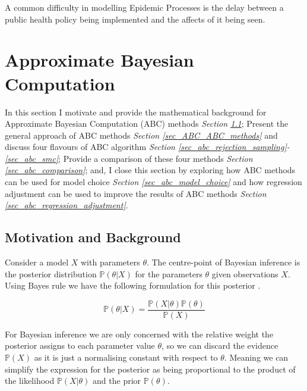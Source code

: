 \documentclass[11pt,a4paper]{article}
\newcommand*{\prob}{\mathbb{P}}
\theoremstyle{break}
\begin{document}
  \par A common difficulty in modelling Epidemic Processes is the delay between a public health policy being implemented and the affects of it being seen. %

\newpage
\section{Approximate Bayesian Computation}\label{sec_ABC}

  \par In this section I motivate and provide the mathematical background for Approximate Bayesian Computation (ABC) methods \textit{Section \ref{sec_ABC_background}}; Present the general approach of ABC methods \textit{Section \ref{sec_ABC_ABC_methods}} and discuss four flavours of ABC algorithm \textit{Section \ref{sec_abc_rejection_sampling}-\ref{sec_abc_smc}}; Provide a comparison of these four methods \textit{Section \ref{sec_abc_comparison}}; and, I close this section by exploring how ABC methods can be used for model choice \textit{Section \ref{sec_abc_model_choice}} and how regression adjustment can be used to improve the results of ABC methods \textit{Section \ref{sec_abc_regression_adjustment}}.

\subsection{Motivation and Background}\label{sec_ABC_background}


  \par Consider a model $X$ with parameters $\theta$. The centre-point of Bayesian inference is the posterior distribution $\prob(\theta|X)$ for the parameters $\theta$ given observations $X$. Using Bayes rule we have the following formulation for this posterior .

  \[ \prob(\theta|X)=\frac{\prob(X|\theta)\prob(\theta)}{\prob(X)} \]

  \par For Bayesian inference we are only concerned with the relative weight the posterior assigns to each parameter value $\theta$, so we can discard the evidence $\prob(X)$ as it is just a normalising constant with respect to $\theta$. Meaning we can simplify the expression for the posterior as being proportional to the product of the likelihood $\prob(X|\theta)$ and the prior $\prob(\theta)$.
\end{document}
